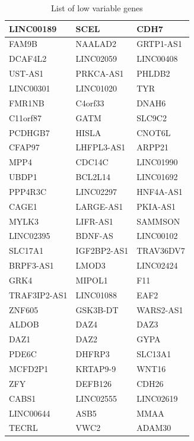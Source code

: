 \documentclass[journal]{IEEEtran}
\begin{document}
\begin{table}[h!]
    \centering
    \begin{tabularx}{\linewidth}{| X | X | X |}
        \hline
        LINC00189 & SCEL  & CDH7 \\ \hline
        FAM9B & NAALAD2 & GRTP1-AS1 \\ \hline
        DCAF4L2 & LINC02059 & LINC00408 \\ \hline
        UST-AS1 & PRKCA-AS1 & PHLDB2 \\ \hline
        LINC00301 & LINC01020 & TYR \\ \hline
        FMR1NB & C4orf33 & DNAH6 \\ \hline
        C11orf87 & GATM & SLC9C2 \\ \hline
        PCDHGB7 & HISLA & CNOT6L \\ \hline
        CFAP97 & LHFPL3-AS1 & ARPP21 \\ \hline
        MPP4 & CDC14C & LINC01990 \\ \hline
        UBDP1 & BCL2L14 & LINC01692 \\ \hline
        PPP4R3C & LINC02297 & HNF4A-AS1 \\ \hline
        CAGE1 & LARGE-AS1 & PKIA-AS1 \\ \hline
        MYLK3 & LIFR-AS1 & SAMMSON \\ \hline
        LINC02395 & BDNF-AS & LINC00102 \\ \hline
        SLC17A1 & IGF2BP2-AS1 & TRAV36DV7 \\ \hline
        BRPF3-AS1 & LMOD3 & LINC02424 \\ \hline
        GRK4 & MIPOL1 & F11 \\ \hline
        TRAF3IP2-AS1 & LINC01088 & EAF2 \\ \hline
        ZNF605 & GSK3B-DT & WARS2-AS1 \\ \hline
        ALDOB & DAZ4 & DAZ3 \\ \hline
        DAZ1 & DAZ2 & GYPA \\ \hline
        PDE6C & DHFRP3 & SLC13A1 \\ \hline
        MCFD2P1 & KRTAP9-9 & WNT16 \\ \hline
        ZFY & DEFB126 & CDH26 \\ \hline
        CABS1 & LINC02555 & LINC02619\\ \hline
         LINC00644 & ASB5 & MMAA \\ \hline
         TECRL & VWC2 & ADAM30 \\ \hline
    \end{tabularx}
\caption{List of low variable genes}\label{table:low_var_predictors}
\end{table}
\end{document}
